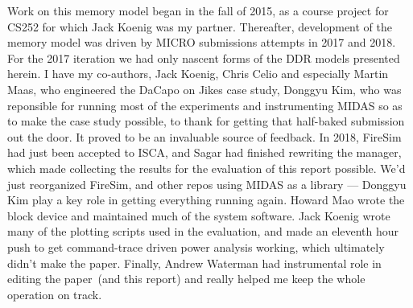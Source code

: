 Work on this memory model began in the fall of 2015, as a course project for
CS252 for which Jack Koenig was my partner. Thereafter, development of the
memory model was driven by MICRO submissions attempts in 2017 and 2018. For the
2017 iteration we had only nascent forms of the DDR models presented herein. I
have my co-authors, Jack Koenig, Chris Celio and especially Martin Maas, who
engineered the DaCapo on Jikes case study, Donggyu Kim, who was reponsible for
running most of the experiments and instrumenting MIDAS so as to make the case
study possible, to thank for getting that half-baked submission out the door.
It proved to be an invaluable source of feedback.  In 2018, FireSim had just
been accepted to ISCA, and Sagar had finished rewriting the manager, which made
collecting the results for the evaluation of this report possible. We'd just
reorganized FireSim, and other repos using MIDAS as a library --- Donggyu Kim
play a key role in getting everything running again.  Howard Mao wrote the
block device and maintained much of the system software.  Jack Koenig wrote
many of the plotting scripts used in the evaluation, and made an eleventh hour
push to get command-trace driven power analysis working, which ultimately
didn't make the paper. Finally, Andrew Waterman had instrumental role in
editing the paper~(and this report) and really helped me keep the whole
operation on track.

